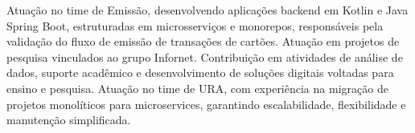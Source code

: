 \documentclass[10pt,a4paper,ragged2e,withhyper]{altacv}
\let\oldquote\quote
\let\endoldquote\endquote
\renewenvironment{quote}{\oldquote\color{body}}{\endoldquote}
\begin{document}
\begin{paracol}{2}
            \begin{quote}
                Atuação no time de Emissão, desenvolvendo aplicações backend em Kotlin e Java Spring Boot, estruturadas em microsserviços e monorepos, responsáveis pela validação do fluxo de emissão de transações de cartões.
            \end{quote}
            \divider
            \begin{quote}
                Atuação em projetos de pesquisa vinculados ao grupo Infornet.
                Contribuição em atividades de análise de dados, suporte acadêmico e desenvolvimento de soluções digitais voltadas para ensino e pesquisa.
            \end{quote}
            \divider
            \begin{quote}
                Atuação no time de URA, com experiência na migração de projetos monolíticos para microservices, garantindo escalabilidade, flexibilidade e manutenção simplificada.
            \end{quote}
        
            \divider
            
        
    \end{paracol}
\end{document}
